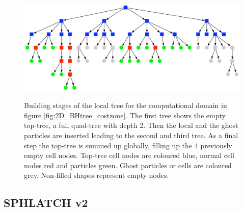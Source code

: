 \begin{figure}[htbp]
\begin{center}
\includegraphics[scale=0.35]{07quadtree50_TPL2_stage3.pdf}\\
\caption{Building stages of the local tree for the computational domain in figure \ref{fig:2D_BHtree_costzone}. The first tree shows the empty top-tree, a full quad-tree with depth 2. Then the local and the ghost particles are inserted leading to the second and third tree. As a final step the top-tree is summed up globally, filling up the 4 previously empty cell nodes. Top-tree cell nodes are coloured blue, normal cell nodes red and particles green. Ghost particles or cells are coloured grey. Non-filled shapes represent empty nodes.}
\label{fig:2D_BHtree_building}
\end{center}
\end{figure}




\subsection{SPHLATCH v2}

